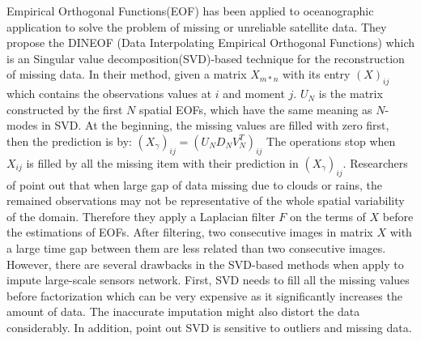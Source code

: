 Empirical Orthogonal Functions(EOF) has been applied to oceanographic application to solve the problem of missing or unreliable satellite data\cite{beckers2003eof}. 
They propose the DINEOF (Data Interpolating Empirical Orthogonal Functions) which is an Singular value decomposition(SVD)-based technique for the reconstruction of missing data.
In their method, given a matrix $X_{m*n}$ with its entry $(X)_{ij}$ which contains the observations values at $i$ and moment $j$. 
$U_N$ is the matrix constructed by the first $N$ spatial EOFs, which have the same meaning as $N$-modes in SVD. 
At the beginning, the missing values are filled with zero first, then the prediction is by:
$(X_\gamma)_{ij} = (U_ND_NV_N^T)_{ij}$
\label{EOF}
The operations stop when $X_{ij}$ is filled by all the missing item with their prediction in $(X_\gamma)_{ij}$. 
Researchers of \cite{alvera2009enhancing} point out that when large gap of data missing due to clouds or rains, the remained observations may not be representative of the whole spatial variability of the domain. Therefore they apply a Laplacian filter $F$ on the terms of $X$ before the estimations of EOFs. After filtering, two consecutive images in matrix $X$ with a large time gap between them are less related than two consecutive images. 
However, there are several drawbacks in the SVD-based methods when apply to impute large-scale sensors network. First, SVD needs to fill all the missing values before factorization which can be very expensive as it significantly increases the amount of data. The inaccurate imputation might also distort the data considerably\cite{koren2009matrix}. In addition,\cite{ke2005robust} point out SVD is sensitive to outliers and missing data. 
  
